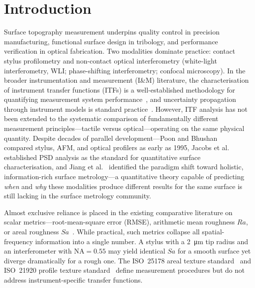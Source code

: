 \documentclass[review,12pt]{elsarticle}
\begin{document}
\linenumbers

\section{Introduction}

Surface topography measurement underpins quality control in precision manufacturing, functional surface design in tribology, and performance verification in optical fabrication. Two modalities dominate practice: contact stylus profilometry and non-contact optical interferometry (white-light interferometry, WLI; phase-shifting interferometry; confocal microscopy). In the broader instrumentation and measurement (I\&M) literature, the characterisation of instrument transfer functions (ITFs) is a well-established methodology for quantifying measurement system performance~\cite{foreman2013determination,leach2010bandwidth,degroot2021itf}, and uncertainty propagation through instrument models is standard practice~\cite{giusca2011virtual}. However, ITF analysis has not been extended to the systematic comparison of fundamentally different measurement principles---tactile versus optical---operating on the same physical quantity. Despite decades of parallel development---Poon and Bhushan~\cite{poon1995comparison} compared stylus, AFM, and optical profilers as early as 1995, Jacobs et al.~\cite{jacobs2017quantitative} established PSD analysis as the standard for quantitative surface characterisation, and Jiang et al.~\cite{jiang2007paradigm} identified the paradigm shift toward holistic, information-rich surface metrology---a quantitative theory capable of predicting \emph{when} and \emph{why} these modalities produce different results for the same surface is still lacking in the surface metrology community.

Almost exclusive reliance is placed in the existing comparative literature on scalar metrics---root-mean-square error (RMSE), arithmetic mean roughness $Ra$, or areal roughness $Sa$~\cite{czifra2011surface}. While practical, such metrics collapse all spatial-frequency information into a single number. A stylus with a \SI{2}{\micro m} tip radius and an interferometer with $\mathrm{NA}=0.55$ may yield identical $Sa$ for a smooth surface yet diverge dramatically for a rough one. The ISO~25178 areal texture standard~\cite{iso25178} and ISO~21920 profile texture standard~\cite{iso21920} define measurement procedures but do not address instrument-specific transfer functions.
\end{document}
